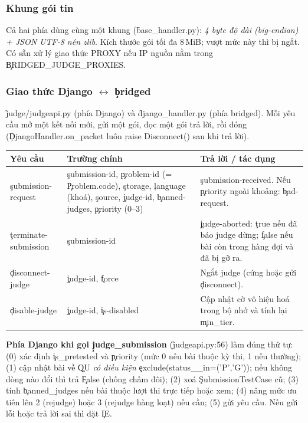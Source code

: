 \subsubsection{Khung gói tin}
Cả hai phía dùng cùng một khung (\f{base_handler.py}): \emph{4 byte độ dài (big-endian) + JSON UTF-8 nén zlib}. Kích thước gói tối đa 8\,MiB; vượt mức này thì bị ngắt. Có sẵn xử lý giao thức PROXY nếu IP nguồn nằm trong \c{BRIDGED_JUDGE_PROXIES}. \tS

\subsubsection{Giao thức Django $\leftrightarrow$ \c{bridged}}
\f{judge/judgeapi.py} (phía Django) và \f{django_handler.py} (phía bridged). Mỗi yêu cầu mở một kết nối mới, gửi một gói, đọc một gói trả lời, rồi đóng (\c{DjangoHandler.on_packet} luôn \c{raise Disconnect()} sau khi trả lời). \tS
\begin{center}\small
\begin{tabularx}{\textwidth}{@{}L{3.5cm}L{5.2cm}Y@{}}
\toprule
Yêu cầu & Trường chính & Trả lời / tác dụng \\
\midrule
\c{submission-request} & \c{submission-id}, \c{problem-id} (= \c{Problem.code}), \c{storage}, \c{language} (khoá), \c{source}, \c{judge-id}, \c{banned-judges}, \c{priority} (0--3) & \c{submission-received}. Nếu \c{priority} ngoài khoảng: \c{bad-request}. \\
\c{terminate-submission} & \c{submission-id} & \c{judge-aborted}: \c{true} nếu đã báo judge dừng; \c{false} nếu bài còn trong hàng đợi và đã bị gỡ ra. \\
\c{disconnect-judge} & \c{judge-id}, \c{force} & Ngắt judge (cứng hoặc gửi \c{disconnect}). \\
\c{disable-judge} & \c{judge-id}, \c{is-disabled} & Cập nhật cờ vô hiệu hoá trong bộ nhớ và tính lại \c{min_tier}. \\
\bottomrule
\end{tabularx}
\end{center}

\textbf{Phía Django khi gọi \c{judge_submission}} (\f{judgeapi.py:56}) làm đúng thứ tự: (0) xác định \c{is_pretested} và \c{priority} (mức 0 nếu bài thuộc kỳ thi, 1 nếu thường); (1) cập nhật bài về \c{QU} \emph{có điều kiện} \c{exclude(status__in=('P','G'))}; nếu không dòng nào đổi thì trả \c{False} (chống chấm đôi); (2) xoá \c{SubmissionTestCase} cũ; (3) tính \c{banned_judges} nếu bài thuộc lượt thi trực tiếp hoặc xem; (4) nâng mức ưu tiên lên 2 (rejudge) hoặc 3 (rejudge hàng loạt) nếu cần; (5) gửi yêu cầu. Nếu gửi lỗi hoặc trả lời sai thì đặt \c{IE}. \tS

